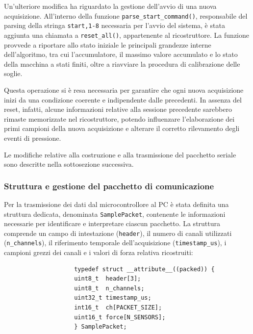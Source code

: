 \documentclass[10pt, a4paper]{article}
\begin{document}
                Un'ulteriore modifica ha riguardato la gestione dell'avvio di una nuova acquisizione. All'interno della funzione \texttt{parse\_start\_command()}, responsabile
                del parsing della stringa \texttt{start,1-8} necessaria per l'avvio del sistema, è 
                stata aggiunta una chiamata a \texttt{reset\_all()}, appartenente al ricostruttore. La funzione provvede a riportare allo stato iniziale 
                le principali grandezze interne dell'algoritmo, tra cui l'accumulatore, il massimo valore accumulato e lo stato della macchina a stati finiti, 
                oltre a riavviare la procedura di calibrazione delle soglie.

                Questa operazione si è resa necessaria per garantire che ogni nuova acquisizione inizi da una condizione coerente e indipendente dalle precedenti. 
                In assenza del reset, infatti, alcune informazioni relative alla sessione precedente sarebbero rimaste memorizzate nel ricostruttore, potendo 
                influenzare l'elaborazione dei primi campioni della nuova acquisizione e alterare il corretto rilevamento degli eventi di pressione.

                Le modifiche relative alla costruzione e alla trasmissione del pacchetto seriale sono descritte nella sottosezione successiva.

            \subsubsection{Struttura e gestione del pacchetto di comunicazione}

                Per la trasmissione dei dati dal microcontrollore al PC è stata definita una struttura dedicata, denominata \texttt{SamplePacket}, 
                contenente le informazioni necessarie per identificare e interpretare ciascun pacchetto. La struttura comprende un campo di intestazione
                 (\texttt{header}), il numero di canali utilizzati (\texttt{n\_channels}), il riferimento temporale dell'acquisizione (\texttt{timestamp\_us}),
                 i campioni grezzi dei canali e i valori di forza relativa ricostruiti:

                \begin{verbatim}
                    typedef struct __attribute__((packed)) {
                    uint8_t  header[3];
                    uint8_t  n_channels;
                    uint32_t timestamp_us;
                    int16_t  ch[PACKET_SIZE];
                    uint16_t force[N_SENSORS];
                    } SamplePacket;
                \end{verbatim}
\end{document}
